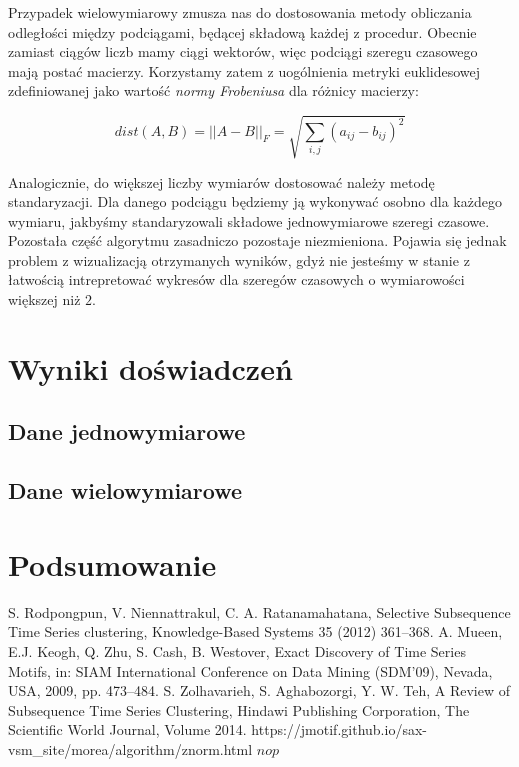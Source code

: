 \documentclass{article}
\theoremstyle{definition}
\begin{document}
Przypadek wielowymiarowy zmusza nas do dostosowania metody obliczania odległości między podciągami, będącej składową każdej z procedur.
Obecnie zamiast ciągów liczb mamy ciągi wektorów, więc podciągi szeregu czasowego mają postać macierzy.
Korzystamy zatem z uogólnienia metryki euklidesowej zdefiniowanej jako wartość \textit{normy Frobeniusa} dla różnicy macierzy:

$$ dist(A, B) = ||A - B||_{F} = \sqrt{\sum_{i,j} (a_{ij} - b_{ij})^{2}} $$

Analogicznie, do większej liczby wymiarów dostosować należy metodę standaryzacji. Dla danego podciągu będziemy ją wykonywać osobno dla każdego wymiaru, jakbyśmy standaryzowali składowe jednowymiarowe szeregi czasowe. Pozostała część algorytmu zasadniczo pozostaje niezmieniona. Pojawia się jednak problem z wizualizacją otrzymanych wyników, gdyż nie jesteśmy w stanie z łatwością intrepretować wykresów dla szeregów czasowych o wymiarowości większej niż $2$.


\section{Wyniki doświadczeń}

\subsection{Dane jednowymiarowe}


\subsection{Dane wielowymiarowe}


\section{Podsumowanie}


\begin{thebibliography}{1}
 S. Rodpongpun, V. Niennattrakul, C. A. Ratanamahatana, Selective Subsequence Time Series clustering, Knowledge-Based Systems 35 (2012) 361–368.
 A. Mueen, E.J. Keogh, Q. Zhu, S. Cash, B. Westover, Exact Discovery of Time Series Motifs, in: SIAM International Conference on Data Mining (SDM’09), Nevada, USA, 2009, pp. 473–484.
 S. Zolhavarieh, S. Aghabozorgi, Y. W. Teh, A Review of Subsequence Time Series Clustering, Hindawi Publishing Corporation, The Scientific World Journal,
Volume 2014.
 https://jmotif.github.io/sax-vsm\_site/morea/algorithm/znorm.html
 $nop$
\end{thebibliography}
\end{document}
